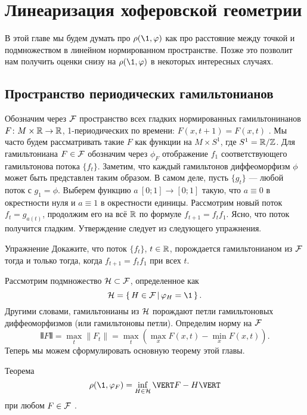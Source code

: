 \chapter{Линеаризация хоферовской геометрии}

В этой главе мы будем думать про $\rho (\1, \phi)$ как про расстояние между точкой и подмножеством в линейном нормированном пространстве.
Позже это позволит нам получить оценки снизу на $\rho (\1, \phi)$ в некоторых интересных случаях.

\section{Пространство периодических гамильтонианов}

Обозначим через $\mathcal{F}$ пространство всех гладких нормированных
гамильтонинанов $F\colon M \times \mathbb{R} \to \mathbb{R}$, 1-периодических по
времени: $F (x, t + 1) = F (x, t)$ .
Мы часто будем рассматривать такие $F$ как функции на $M \times S^1$,
где $S^1 = \mathbb{R} / \mathbb{Z}$. 
Для гамильтониана $F \in \mathcal{F}$ обозначим через $\phi_F$ отображение
$f_1$ соответствующего гамильтонова потока $\{f_t\}$. 
Заметим, что каждый гамильтонов диффеоморфизм $\phi$ может быть
представлен таким образом. 
В самом деле, пусть $\{g_t\}$ --- любой поток с $g_1 = \phi$.
Выберем функцию $a\: [0; 1] \to [0; 1]$ такую, что $a \equiv 0$ в окрестности нуля и $a \equiv 1$ в окрестности единицы.
Рассмотрим новый поток $f_t = g_{a(t)}$, 
продолжим его на всё $\mathbb{R}$ по формуле $f_{t+1} = f_t f_1$.
Ясно, что поток получится гладким.
Утверждение следует из следующего упражнения.

\begin{ex}{Упражнение}\label{5.1.A}
Докажите, что  поток $\{f_t\}$, $t \in \mathbb{R}$,
порождается гамильтонианом из $\mathcal{F}$ тогда и только тогда, когда
$f_{t+1} = f_t f_1$ при всех $t$. 
\end{ex}

Рассмотрим подмножество $\mathcal{H} \subset \mathcal{F}$, определенное как 
\[\H = \set{H \in \F}{\phi_H = \1}.\]
Другими словами, гамильтонианы из $\mathcal{H}$ порождают петли гамильтоновых диффеоморфизмов (или гамильтоновы петли).
Определим норму на $\mathcal{F}$ 
\[\VERT F \VERT = \max_{t} \| F_t \| = \max_{t} (\max_{x} F (x, t) -
\min_{x} F (x, t)).\]
Теперь мы можем сформулировать основную теорему этой главы.

\begin{thm}{Теорема}\label{5.1.B}
\[\rho (\1, \phi_F) = \inf_{H\in\H} \VERT F - H \VERT\]
при любом $F \in \mathcal{F}$ .
\end{thm}

